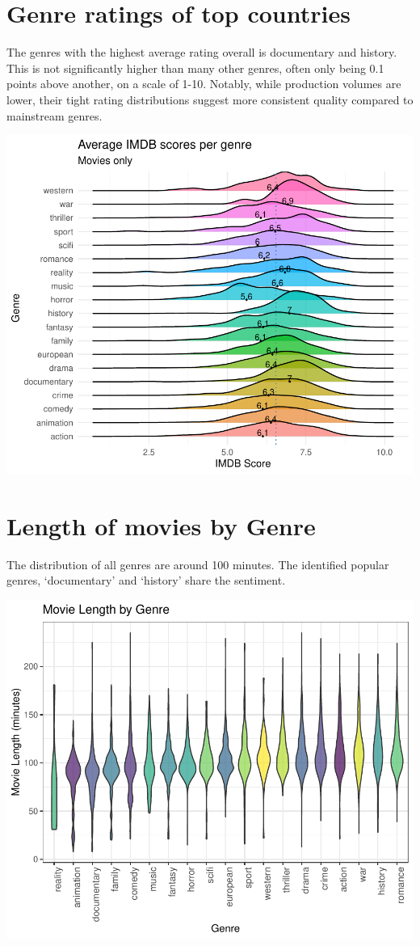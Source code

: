 \documentclass[11pt,preprint]{elsarticle}
\numberwithin{equation}{section}
\numberwithin{figure}{section}
\numberwithin{table}{section}
\begin{document}
\newpage

\section{Genre ratings of top
countries}\label{genre-ratings-of-top-countries}

The genres with the highest average rating overall is documentary and
history. This is not significantly higher than many other genres, often
only being 0.1 points above another, on a scale of 1-10. Notably, while
production volumes are lower, their tight rating distributions suggest
more consistent quality compared to mainstream genres.

\begin{center}\includegraphics[width=0.8\linewidth]{Question3_files/figure-latex/unnamed-chunk-3-1} \end{center}

\newpage

\section{Length of movies by Genre}\label{length-of-movies-by-genre}

The distribution of all genres are around 100 minutes. The identified
popular genres, `documentary' and `history' share the sentiment.

\begin{center}\includegraphics[width=0.8\linewidth]{Question3_files/figure-latex/unnamed-chunk-4-1} \end{center}
\end{document}
